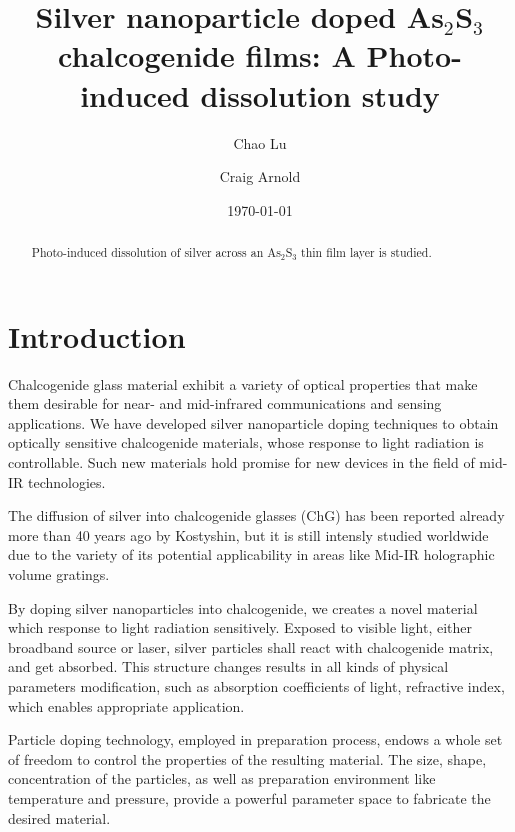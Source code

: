 \documentclass[twocolumn,showpacs,preprintnumbers,amsmath,amssymb]{revtex4}
\begin{document}

\title{Silver nanoparticle doped As$_2$S$_3$ chalcogenide
  films: A Photo-induced dissolution study }

\author{Chao Lu}
\author{Craig Arnold}
\date{\today}

\begin{abstract}
  Photo-induced dissolution of silver across an As$_2$S$_3$
  thin film layer is studied.
\end{abstract}

\maketitle

\section{\label{sec:intro}Introduction}
Chalcogenide glass material exhibit a variety of optical properties
that make them desirable for near- and mid-infrared communications and
sensing applications. We have developed silver nanoparticle doping
techniques to obtain optically sensitive chalcogenide materials, whose
response to light radiation is controllable. Such new materials hold
promise for new devices in the field of mid-IR technologies.

The diffusion of silver into chalcogenide glasses (ChG) has been
reported already more than 40 years ago by Kostyshin, but it is still
intensly studied worldwide due to the variety of its potential
applicability in areas like Mid-IR holographic volume gratings.

By doping silver nanoparticles into chalcogenide, we creates a novel
material which response to light radiation sensitively. Exposed to
visible light, either broadband source or laser, silver particles
shall react with chalcogenide matrix, and get absorbed. This structure
changes results in all kinds of physical parameters modification, such
as absorption coefficients of light, refractive index, which enables
appropriate application.

Particle doping technology, employed in preparation process, endows a
whole set of freedom to control the properties of the resulting
material. The size, shape, concentration of the particles, as well as
preparation environment like temperature and pressure, provide a
powerful parameter space to fabricate the desired material.
\end{document}
